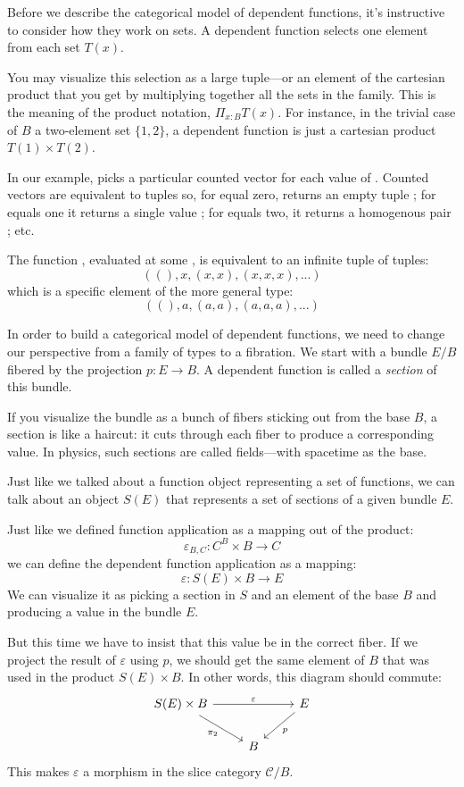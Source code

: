 \documentclass[DaoFP]{subfiles}
\begin{document}
Before we describe the categorical model of dependent functions, it's instructive to consider how they work on sets. A dependent function selects one element from each set $T(x)$. 

You may visualize this selection as a large tuple---or an element of the cartesian product that you get by multiplying together all the sets in the family. This is the meaning of the product notation, $\Pi_{x:B} T(x)$. For instance, in the trivial case of $B$ a two-element set $\{1, 2\}$, a dependent function is just a cartesian product $T(1) \times T(2)$. 

In our example,  picks a particular counted vector for each value of . Counted vectors are equivalent to tuples so, for  equal zero,  returns an empty tuple \hask{()}; for  equals one it returns a single value ; for  equals two, it returns a homogenous pair ; etc. 

The function , evaluated at some ,  is equivalent to an infinite tuple of tuples:
\[ ((), x, (x, x), (x, x, x), ...) \]
which is a specific element of the more general type:
\[ ((), a, (a, a), (a, a, a), ...) \]

In order to build a categorical model of dependent functions, we need to change our perspective from a family of types to a fibration. We start with a bundle $E/B$ fibered by the projection $p\colon E \to B$. A dependent function is called a \emph{section} of this bundle. 

If you visualize the bundle as a bunch of fibers sticking out from the base $B$, a section is like a haircut: it cuts through each fiber to produce a corresponding value. In physics, such sections are called fields---with spacetime as the base. 

Just like we talked about a function object representing a set of functions, we can talk about an object $S(E)$ that represents a set of sections of a given bundle $E$. 

Just like we defined function application as a mapping out of the product:
\[\varepsilon_{B, C} \colon C^B \times B \to C\]
we can define the dependent function application as a mapping:
\[\varepsilon \colon S(E) \times B \to E\]
We can visualize it as picking a section in $S$ and an element of the base $B$ and producing a value in the bundle $E$. 

But this time we have to insist that this value be in the correct fiber. If we project the result of $\varepsilon$ using $p$, we should get the same element of $B$ that was used in the product $S(E) \times B$. In other words, this diagram should commute:
\[
 \begin{tikzcd}
 S(E) \times B 
 \arrow[rr, "\varepsilon"]
 \arrow[dr, "\pi_2"']
 && E
 \arrow[dl, "p"]
 \\
 &B
  \end{tikzcd}
\]
This makes $\varepsilon$ a morphism in the slice category $\mathcal{C}/B$.
\end{document}
